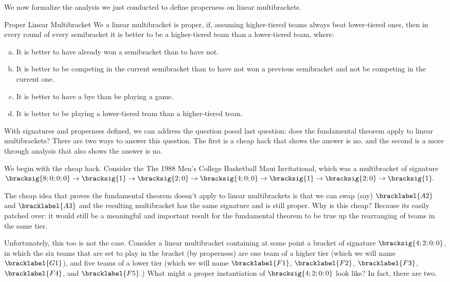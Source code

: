 {We now formalize the analysis we just conducted to define properness on linear multibrackets.

\begin{definition}{Proper Linear Multibracket}{}
    We a linear multibracket is proper, if, assuming higher-tiered teams always beat lower-tiered ones, then in every round of every semibracket it is better to be a higher-tiered team than a lower-tiered team, where:
    \begin{enumerate}[(a)]
        \item It is better to have already won a semibracket than to have not.
        \item It is better to be competing in the current semibracket than to have not won a previous semibracket and not be competing in the current one.
        \item It is better to have a bye than be playing a game.
        \item It is better to be playing a lower-tiered team than a higher-tiered team.
    \end{enumerate}
\end{definition}

With signatures and properness defined, we can address the question posed last question: does the fundamental theorem apply to linear multibrackets? There are two ways to answer this question. The first is a cheap hack that shows the answer is no, and the second is a more through analysis that also shows the answer is no.

We begin with the cheap hack. Consider the The 1988 Men's College Basketball Maui Invitational, which was a multibracket of signature $\bracksig{8;0;0;0} \to \bracksig{1} \to \bracksig{2;0} \to \bracksig{4;0;0} \to \bracksig{1} \to \bracksig{2;0} \to \bracksig{1}.$


The cheap idea that proves the fundamental theorem doesn't apply to linear multibrackets is that we can swap (say) $\bracklabel{A2}$ and $\bracklabel{A3}$ and the resulting multibracket has the same signature and is still proper. Why is this cheap? Because its easily patched over: it would still be a meaningful and important result for the fundamental theorem to be true up the rearranging of teams in the same tier.

Unfortunately, this too is not the case. Consider a linear multibracket containing at some point a bracket of signature $\bracksig{4;2;0;0}$, in which the six teams that are set to play in the bracket (by properness) are one team of a higher tier (which we will name $\bracklabel{G1}$), and five teams of a lower tier (which we will name $\bracklabel{F1}$, $\bracklabel{F2}$, $\bracklabel{F3}$, $\bracklabel{F4}$, and $\bracklabel{F5}$.) What might a proper instantiation of $\bracksig{4;2;0;0}$ look like? In fact, there are two.

}
